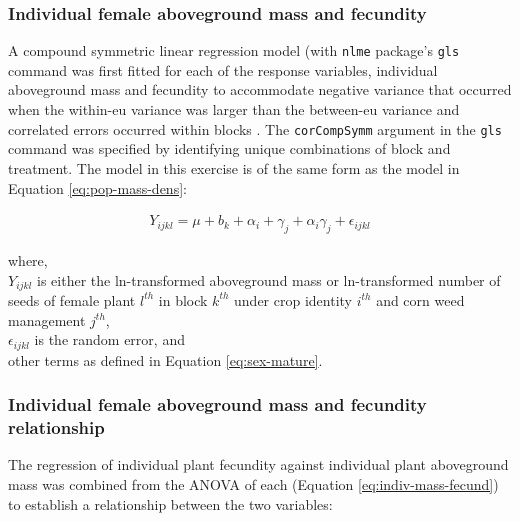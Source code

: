 \documentclass[
]{article}
\begin{document}
\hypertarget{individual-female-aboveground-mass-and-fecundity-1}{%
\subsubsection*{Individual female aboveground mass and fecundity}\label{individual-female-aboveground-mass-and-fecundity-1}}

A compound symmetric linear regression model (with \texttt{nlme} package's \texttt{gls} command was first fitted for each of the response variables, individual aboveground mass and fecundity to accommodate negative variance that occurred when the within-eu variance was larger than the between-eu variance and correlated errors occurred within blocks \citep[version 3.1-153,][]{pinheroNlmeLinearNonlinear2021}.
The \texttt{corCompSymm} argument in the \texttt{gls} command was specified by identifying unique combinations of block and treatment. The model in this exercise is of the same form as the model in Equation \eqref{eq:pop-mass-dens}:

\begin{align}
Y_{ijkl} = \mu + b_k + \alpha_i + \gamma_j +\alpha_i \gamma_j + \epsilon_{ijkl} \label{eq:indiv-mass-fecund}
\end{align}

where,\\
\(Y_{ijkl}\) is either the ln-transformed aboveground mass or ln-transformed number of seeds of female plant \(l^{th}\) in block \(k^{th}\) under crop identity \(i^{th}\) and corn weed management \(j^{th}\),\\
\(\epsilon_{ijkl}\) is the random error, and \\
other terms as defined in Equation \eqref{eq:sex-mature}.

\hypertarget{individual-female-aboveground-mass-and-fecundity-relationship}{%
\subsubsection*{Individual female aboveground mass and fecundity relationship}\label{individual-female-aboveground-mass-and-fecundity-relationship}}

The regression of individual plant fecundity against individual plant aboveground mass was combined from the ANOVA of each (Equation \eqref{eq:indiv-mass-fecund}) to establish a relationship between the two variables:
\end{document}
